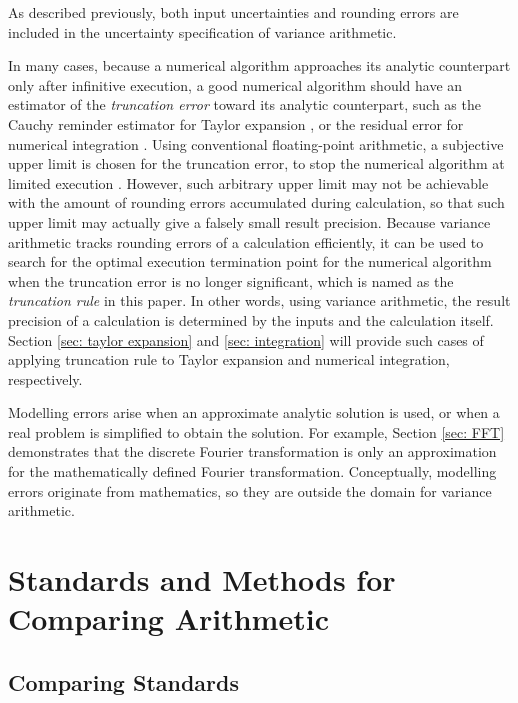 \documentclass[twoside]{article}
\numberwithin{equation}{section}
\begin{document}
As described previously, both input uncertainties and rounding errors are included in the uncertainty specification of variance arithmetic.

In many cases, because a numerical algorithm approaches its analytic counterpart only after infinitive execution, a good numerical algorithm should have an estimator of the \emph{truncation error} toward its analytic counterpart, such as the Cauchy reminder estimator for Taylor expansion \cite{Numerical_Recipes}, or the residual error for numerical integration \cite{Numerical_Recipes}.  Using conventional floating-point arithmetic, a subjective upper limit is chosen for the truncation error, to stop the numerical algorithm at limited execution \cite{Numerical_Recipes}. However, such arbitrary upper limit may not be achievable with the amount of rounding errors accumulated during calculation, so that such upper limit may actually give a falsely small result precision. Because variance arithmetic tracks rounding errors of a calculation efficiently, it can be used to search for the optimal execution termination point for the numerical algorithm when the truncation error is no longer significant, which is named as the \emph{truncation rule} in this paper. In other words, using variance arithmetic, the result precision of a calculation is determined by the inputs and the calculation itself.  Section \ref{sec: taylor expansion} and \ref{sec: integration} will provide such cases of applying truncation rule to Taylor expansion and numerical integration, respectively.

Modelling errors arise when an approximate analytic solution is used, or when a real problem is simplified to obtain the solution.  For example, Section \ref{sec: FFT} demonstrates that the discrete Fourier transformation is only an approximation for the mathematically defined Fourier transformation.  Conceptually, modelling errors originate from mathematics, so they are outside the domain for variance arithmetic.




\clearpage
\section{Standards and Methods for Comparing Arithmetic}
\label{sec: validation}


\subsection{Comparing Standards}
\end{document}
